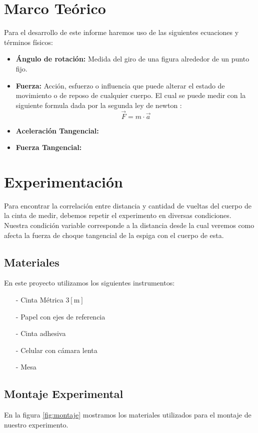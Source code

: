\documentclass{article}
\begin{document}
\section{Marco Teórico}
Para el desarrollo de este informe haremos uso de las siguientes ecuaciones y términos físicos:

\begin{itemize}
    \item \textbf{Ángulo de rotación:} Medida del giro de una figura alrededor de un punto fijo.
    \item \textbf{Fuerza:} Acción, esfuerzo o influencia que puede alterar el estado de movimiento o de reposo de cualquier cuerpo. El cual se puede medir con la siguiente formula dada por la segunda ley de newton :
    \begin{equation*}
       \vec F = m \cdot \vec a
    \end{equation*}
    \item \textbf{Aceleración Tangencial:}
    \item \textbf{Fuerza Tangencial:}
\end{itemize}

\section{Experimentación}
Para encontrar la correlación entre distancia y cantidad de vueltas del cuerpo de la cinta de medir, debemos repetir el experimento en diversas condiciones. Nuestra condición variable corresponde a la distancia desde la cual veremos como afecta la fuerza de choque tangencial de la espiga con el cuerpo de esta.

\subsection{Materiales}
En este proyecto utilizamos los siguientes instrumentos:
\begin{itemize}
    \item[-] Cinta Métrica 3$[\text{m}]$
    \item[-] Papel con ejes de referencia
    \item[-] Cinta adhesiva
    \item[-] Celular con cámara lenta
    \item[-] Mesa
\end{itemize}
    
\subsection{Montaje Experimental}
  En la figura \ref{fig:montaje} mostramos los materiales utilizados para el montaje de nuestro experimento.
  
\end{document}
